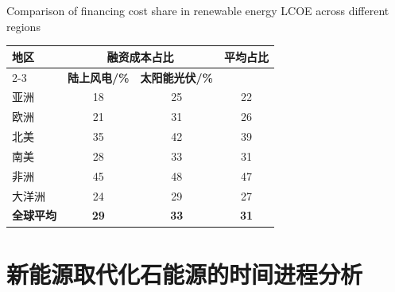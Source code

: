 \documentclass[twocolumn, a4paper, 10pt, UTF8]{ctexart}
\begin{document}
\begin{table}[htbp]
    \centering
    {Comparison of financing cost share in renewable energy LCOE across different regions}
    \label{tab:cost-structure}
    \small
    \begin{tabular}{lccc}
        \toprule
        \multirow{2}{*}{\textbf{地区}} & \multicolumn{2}{c}{\textbf{融资成本占比}} & \multirow{2}{*}{\textbf{平均占比}}               \\
        \cmidrule(lr){2-3}
                                     & \textbf{陆上风电/\%}                    & \textbf{太阳能光伏/\%}              &             \\
        \midrule
        亚洲                           & 18                                  & 25                             & 22          \\
        欧洲                           & 21                                  & 31                             & 26          \\
        北美                           & 35                                  & 42                             & 39          \\
        南美                           & 28                                  & 33                             & 31          \\
        非洲                           & 45                                  & 48                             & 47          \\
        大洋洲                          & 24                                  & 29                             & 27          \\
        \midrule
        \textbf{全球平均}                & \textbf{29}                         & \textbf{33}                    & \textbf{31} \\
        \bottomrule
    \end{tabular}

    \vspace{0.5em}
\end{table}

\section{新能源取代化石能源的时间进程分析}
\end{document}
